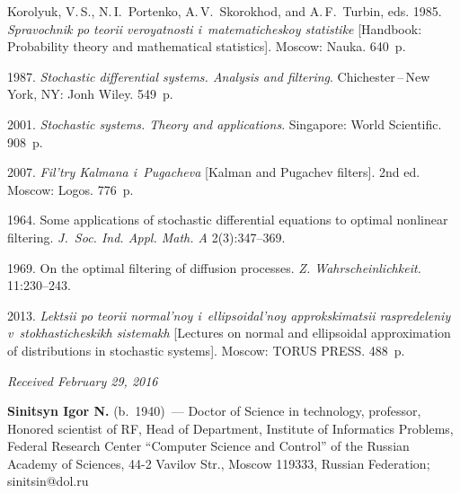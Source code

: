 \begin{multicols}{2}
{{\begin{thebibliography}{99}
Korolyuk, V.\,S., N.\,I.~Portenko, A.\,V.~Skorokhod, and
A.\,F.~Turbin, eds. 1985.
\textit{Spravochnik po teorii veroyatnosti i~matematicheskoy statistike}
[Handbook: Probability theory and mathematical statistics].
 Moscow: Nauka. 640~p.

1987. \textit{Stochastic differential systems.
Analysis and filtering}. Chichester\,--\,New York, NY: Jonh Wiley.
549~p.


 2001.  \textit{Stochastic systems. Theory and  applications}.
Singapore: World Scientific. 908~p.


 2007.
\textit{Fil'try Kalmana i~Pugacheva} [Kalman and Pugachev filters]. 
2nd ed. Moscow: Logos. 776~p.

 1964.
Some applications of stochastic differential equations to optimal nonlinear 
filtering. \textit{J.~Soc. Ind. Appl. Math. A} 2(3):347--369.

 1969.
On the optimal filtering of diffusion processes.
\textit{Z. Wahrscheinlichkeit.} 11:230--243.


 2013.
\textit{Lektsii po teorii normal'noy i~ellipsoidal'noy approkskimatsii raspredeleniy 
v~stokhasticheskikh sistemakh} [Lectures on normal and ellipsoidal approximation 
of distributions in stochastic systems].  Moscow: TORUS PRESS. 488~p.

\end{thebibliography}

 }
 }

\end{multicols}

\vspace*{-3pt}

\hfill{\small\textit{Received February 29, 2016}}

\Contr


\noindent
\textbf{Sinitsyn Igor N.} (b.\ 1940)~---
Doctor of Science in technology, professor,
Honored scientist of RF, Head of Department, Institute of Informatics Problems, Federal Research Center ``Computer Science and
Control'' of the Russian Academy of Sciences, 44-2 Vavilov Str.,
Moscow 119333, Russian Federation; sinitsin@dol.ru

\vspace*{3pt}

